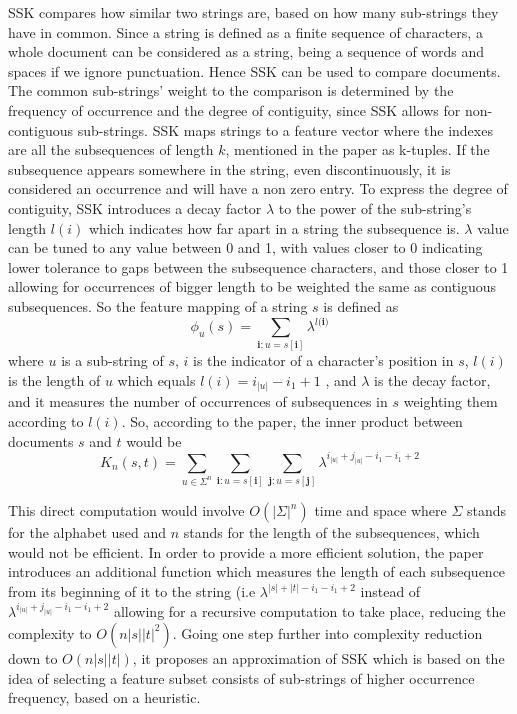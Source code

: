 \documentclass{article}
\begin{document}
SSK compares how similar two strings are, based on how many sub-strings they have in common. Since a string is defined as a finite sequence of characters, a whole document can be considered as a string, being a sequence of words and spaces if we ignore punctuation. Hence SSK can be used to compare documents.  The common sub-strings’ weight to the comparison is determined by the frequency of occurrence and the degree of contiguity, since SSK allows for non-contiguous sub-strings. SSK maps strings to a feature vector where the indexes are all the subsequences of length $k$, mentioned in the paper as k-tuples. If the subsequence appears somewhere in the string, even discontinuously, it is considered an occurrence and will have a non zero entry. To express the degree of contiguity, SSK introduces a decay factor $\lambda$ to the power of the sub-string’s length $l(i)$ which indicates how far apart in a string the subsequence is. $\lambda$ value can be tuned to any value between 0 and 1, with values closer to 0 indicating lower tolerance to gaps between the subsequence characters, and those closer to 1 allowing for occurrences of bigger length to be weighted the same as contiguous subsequences. So the feature mapping of a string $s$ is defined as $$\phi_{u}(s)=\sum_{\bm{i}:u=s[\bm{i}]} \lambda^{l(\bm{i)}}$$ where $u$ is a sub-string of $s$, $i$ is the indicator of a character’s position in $s$, $l(i)$ is the length of $u$ which equals $l(i) = i_{|u|}-i_{1}+1$ , and $\lambda$ is the decay factor, and it measures the number of occurrences of subsequences in $s$ weighting them according to $l(i)$. So, according to the paper, the inner product between documents $s$ and $t$ would be $$K_{n}(s,t)=\sum_{u\in\Sigma^{n}}\sum_{\bm{i}:u=s[\bm{i}]}\sum_{\bm{j}:u=s[{\bm{j}}]} \lambda^{i_{|u|} + j_{|u|} - i_{1} - i_{1} + 2}$$
\par{This direct computation would involve $O(|\Sigma|^{n})$ time and space where $\Sigma$ stands for the alphabet used and $n$ stands for the length of the subsequences, which would not be efficient. In order to provide a more efficient solution, the paper introduces an additional function which measures the length of each subsequence from its beginning of it to the string (i.e $\lambda^{|s| + |t| - i_{1} - i_{1} + 2}$ instead of $\lambda^{i_{|u|} + j_{|u|} - i_{1} - i_{1} + 2}$ allowing for a recursive computation to take place, reducing the complexity to $O(n|s||t|^{2})$. Going one step further into complexity reduction down to $O(n|s||t|)$, it proposes an approximation of SSK which is based on the idea of selecting a feature subset consists of sub-strings of higher occurrence frequency, based on a heuristic.}
\end{document}
